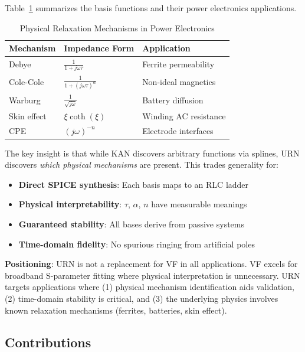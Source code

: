\documentclass{ieeeaccess}
\begin{document}
Table~\ref{tab:physical_mechanisms} summarizes the basis functions and their power electronics applications.

\begin{table}[!t]
\caption{Physical Relaxation Mechanisms in Power Electronics}
\label{tab:physical_mechanisms}
\centering
\begin{tabular}{@{}lll@{}}
\toprule
\textbf{Mechanism} & \textbf{Impedance Form} & \textbf{Application} \\
\midrule
Debye & $\frac{1}{1+j\omega\tau}$ & Ferrite permeability \\
Cole-Cole & $\frac{1}{1+(j\omega\tau)^\alpha}$ & Non-ideal magnetics \\
Warburg & $\frac{1}{\sqrt{j\omega}}$ & Battery diffusion \\
Skin effect & $\xi \coth(\xi)$ & Winding AC resistance \\
CPE & $(j\omega)^{-n}$ & Electrode interfaces \\
\bottomrule
\end{tabular}
\end{table}

The key insight is that while KAN discovers arbitrary functions via splines, URN discovers \textit{which physical mechanisms} are present. This trades generality for:
\begin{itemize}
\item \textbf{Direct SPICE synthesis}: Each basis maps to an RLC ladder
\item \textbf{Physical interpretability}: $\tau$, $\alpha$, $n$ have measurable meanings
\item \textbf{Guaranteed stability}: All bases derive from passive systems
\item \textbf{Time-domain fidelity}: No spurious ringing from artificial poles
\end{itemize}

\textbf{Positioning}: URN is not a replacement for VF in all applications. VF excels for broadband S-parameter fitting where physical interpretation is unnecessary. URN targets applications where (1) physical mechanism identification aids validation, (2) time-domain stability is critical, and (3) the underlying physics involves known relaxation mechanisms (ferrites, batteries, skin effect).

\subsection{Contributions}
\end{document}
